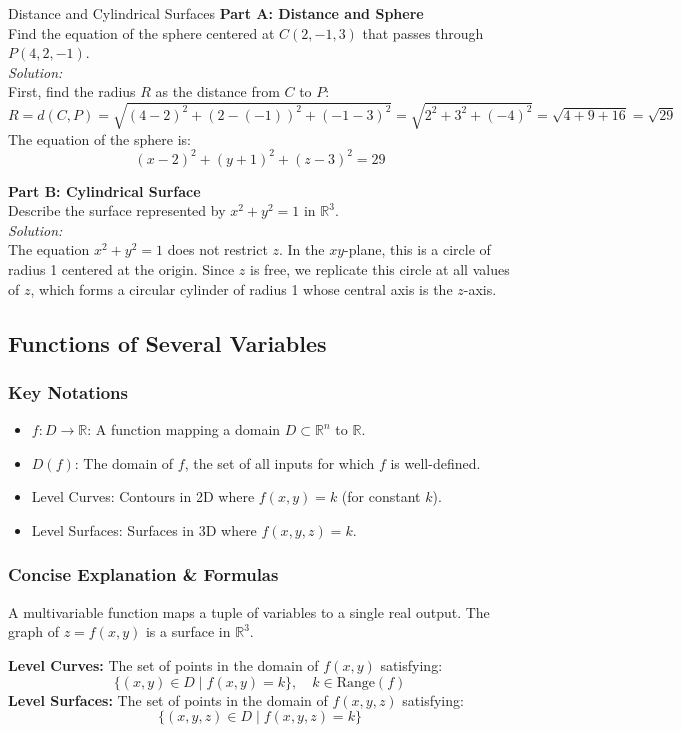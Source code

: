\documentclass[11pt]{article}
\begin{document}
\begin{examplebox}{Distance and Cylindrical Surfaces}
    \textbf{Part A: Distance and Sphere}\\
    Find the equation of the sphere centered at $C(2, -1, 3)$ that passes through $P(4, 2, -1)$.\\
    \textit{Solution:}\\
    First, find the radius $R$ as the distance from $C$ to $P$:
    \[ R = d(C,P) = \sqrt{(4-2)^2 + (2-(-1))^2 + (-1-3)^2} = \sqrt{2^2 + 3^2 + (-4)^2} = \sqrt{4 + 9 + 16} = \sqrt{29} \]
    The equation of the sphere is:
    \[ (x-2)^2 + (y+1)^2 + (z-3)^2 = 29 \]
    
    \textbf{Part B: Cylindrical Surface}\\
    Describe the surface represented by $x^2 + y^2 = 1$ in $\mathbb{R}^3$.\\
    \textit{Solution:}\\
    The equation $x^2 + y^2 = 1$ does not restrict $z$. In the $xy$-plane, this is a circle of radius 1 centered at the origin. Since $z$ is free, we replicate this circle at all values of $z$, which forms a circular cylinder of radius 1 whose central axis is the $z$-axis.
\end{examplebox}


\subsection{Functions of Several Variables}
\subsubsection*{Key Notations}
\begin{itemize}
    \item $f: D \to \mathbb{R}$: A function mapping a domain $D \subset \mathbb{R}^n$ to $\mathbb{R}$.
    \item $D(f)$: The domain of $f$, the set of all inputs for which $f$ is well-defined.
    \item Level Curves: Contours in 2D where $f(x,y) = k$ (for constant $k$).
    \item Level Surfaces: Surfaces in 3D where $f(x,y,z) = k$.
\end{itemize}

\subsubsection*{Concise Explanation \& Formulas}
A multivariable function maps a tuple of variables to a single real output. The graph of $z = f(x,y)$ is a surface in $\mathbb{R}^3$. 
\begin{formulabox}
    \textbf{Level Curves:} The set of points in the domain of $f(x,y)$ satisfying:
    \[ \{(x,y) \in D \mid f(x,y) = k\}, \quad k \in \text{Range}(f) \]
    \textbf{Level Surfaces:} The set of points in the domain of $f(x,y,z)$ satisfying:
    \[ \{(x,y,z) \in D \mid f(x,y,z) = k\} \]
\end{formulabox}
\end{document}
